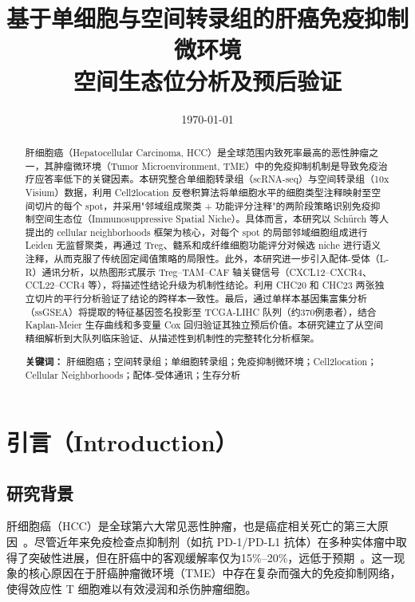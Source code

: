 \documentclass[12pt, a4paper]{ctexart}
\title{
    \vspace{-1cm}
    \textbf{基于单细胞与空间转录组的肝癌免疫抑制微环境\\空间生态位分析及预后验证}
}
\author{
}
\date{\today}
\begin{document}
\maketitle

\begin{abstract}
肝细胞癌（Hepatocellular Carcinoma, HCC）是全球范围内致死率最高的恶性肿瘤之一，其肿瘤微环境（Tumor Microenvironment, TME）中的免疫抑制机制是导致免疫治疗应答率低下的关键因素。本研究整合单细胞转录组（scRNA-seq）与空间转录组（10x Visium）数据，利用 Cell2location 反卷积算法将单细胞水平的细胞类型注释映射至空间切片的每个 spot，并采用"邻域组成聚类 + 功能评分注释"的两阶段策略识别免疫抑制空间生态位（Immunosuppressive Spatial Niche）。具体而言，本研究以 Schürch 等人提出的 cellular neighborhoods 框架为核心，对每个 spot 的局部邻域细胞组成进行 Leiden 无监督聚类，再通过 Treg、髓系和成纤维细胞功能评分对候选 niche 进行语义注释，从而克服了传统固定阈值策略的局限性。此外，本研究进一步引入配体-受体（L-R）通讯分析，以热图形式展示 Treg--TAM--CAF 轴关键信号（CXCL12--CXCR4、CCL22--CCR4 等），将描述性结论升级为机制性结论。利用 CHC20 和 CHC23 两张独立切片的平行分析验证了结论的跨样本一致性。最后，通过单样本基因集富集分析（ssGSEA）将提取的特征基因签名投影至 TCGA-LIHC 队列（约370例患者），结合 Kaplan-Meier 生存曲线和多变量 Cox 回归验证其独立预后价值。本研究建立了从空间精细解析到大队列临床验证、从描述性到机制性的完整转化分析框架。

\noindent\textbf{关键词：} 肝细胞癌；空间转录组；单细胞转录组；免疫抑制微环境；Cell2location；Cellular Neighborhoods；配体-受体通讯；生存分析
\end{abstract}

\newpage
\tableofcontents
\newpage

\section{引言（Introduction）}

\subsection{研究背景}

肝细胞癌（HCC）是全球第六大常见恶性肿瘤，也是癌症相关死亡的第三大原因~\cite{llovet2021hepatocellular}。尽管近年来免疫检查点抑制剂（如抗 PD-1/PD-L1 抗体）在多种实体瘤中取得了突破性进展，但在肝癌中的客观缓解率仅为15\%--20\%，远低于预期~\cite{finn2020atezolizumab}。这一现象的核心原因在于肝癌肿瘤微环境（TME）中存在复杂而强大的免疫抑制网络，使得效应性 T 细胞难以有效浸润和杀伤肿瘤细胞。
\end{document}
